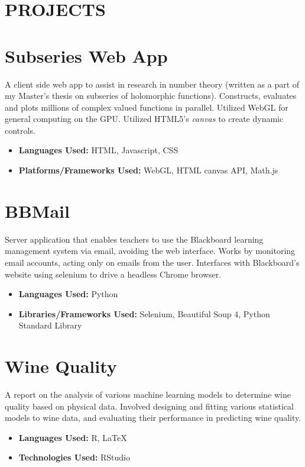 \documentclass[margin]{res}
\begin{document}
  

\address{Email: raphaelreyna@protonmail.com \\
  Phone: (626) 384-1342, Site: www.raphaelreyna.works}
                           
                        
\begin{resume} 
\section{PROJECTS}
  
\normalsize{\section{Subseries Web App}}
A client side web app to assist in
research in number theory (written as a part of my Master's thesis on subseries
of holomorphic functions). Constructs, evaluates and plots millions of complex
valued functions in parallel. Utilized WebGL for general computing on the GPU.
Utilized HTML5's {\it canvas} to create dynamic controls.
\begin{itemize}
\item {\bf Languages Used: } HTML, Javascript, CSS
\item {\bf Platforms/Frameworks Used: } WebGL, HTML canvas API, Math.js
\end{itemize}

\normalsize{\section{BBMail}} Server application that enables teachers to use
the Blackboard learning management system via email, avoiding the web interface.
Works by monitoring email accounts, acting only on emails from the user.
Interfaces with Blackboard's website using selenium to drive a headless Chrome
browser.
\begin{itemize}
\item {\bf Languages Used: } Python
\item {\bf Libraries/Frameworks Used: } Selenium, Beautiful Soup 4, Python
  Standard Library
\end{itemize}

\normalsize{\section{Wine Quality}}
A report on the analysis of various machine learning models to determine wine
quality based on physical data.
Involved designing and fitting various statistical models to wine data, and
evaluating their performance in predicting wine quality.
\begin{itemize}
\item {\bf Languages Used: } R, LaTeX
\item {\bf Technologies Used: } RStudio
\end{itemize}


\end{resume}
\end{document}
